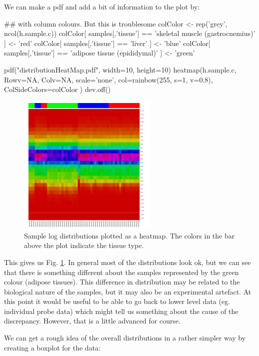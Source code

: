 \documentclass[11pt]{article}
\begin{document}
We can make a pdf and add a bit of information to the plot by:

\begin{rcode}
  ## with column colours. But this is troublesome
  colColor <- rep('grey', ncol(h.sample.c))
  colColor[ samples[,'tissue'] == 'skeletal muscle (gastrocnemius)' ] <- 'red'
  colColor[ samples[,'tissue'] == 'liver' ] <- 'blue'
  colColor[ samples[,'tissue'] == 'adipose tissue (epididymal)' ] <- 'green'
  
  pdf("distributionHeatMap.pdf", width=10, height=10)
  heatmap(h.sample.c, Rowv=NA, Colv=NA, scale='none', col=rainbow(255, s=1, v=0.8),
  ColSideColors=colColor )
  dev.off()
\end{rcode}

\begin{figure}[ht]
  \includegraphics[width=0.6\textwidth]{images/distributionHeatMap.pdf}
  \caption{Sample log distributions plotted as a heatmap. The colors in the bar
  above the plot indicate the tissue type.}
  \label{disthm}
\end{figure}

This gives us Fig. \ref{disthm}. In general most of the distributions look
ok, but we can see that there is something different about the samples
represented by the green colour (adipose tissues). This difference in distribution
may be related to the biological nature of the samples, but it may also be
an experimental artefact. At this point it would be useful to be able to
go back to lower level data (eg. individual probe data) which might tell us
something about the cause of the discrepancy. However, that is a little advanced
for course.

We can get a rough idea of the overall distributions in a rather simpler
way by creating a boxplot for the data:
\end{document}
